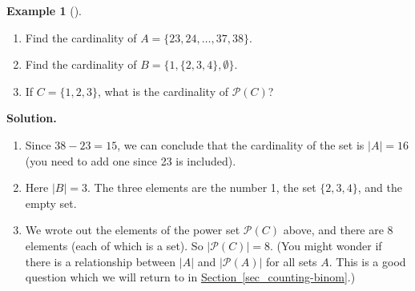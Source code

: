 \documentclass[12pt,]{book}
\theoremstyle{plain}
\theoremstyle{definition}
\theoremstyle{definition}
\newtheorem{example}[theorem]{Example}
\theoremstyle{definition}
\numberwithin{equation}{chapter}
\newcommand{\pow}{\mathcal P}
\newcommand{\card}[1]{\left| #1 \right|}
\begin{document}
\begin{example}[]\label{example-31}
\hypertarget{p-580}{}%
\leavevmode%
\begin{enumerate}
\item\hypertarget{li-253}{}\hypertarget{p-581}{}%
Find the cardinality of \(A = \{23, 24, \ldots, 37, 38\}\).%
\item\hypertarget{li-254}{}\hypertarget{p-582}{}%
Find the cardinality of \(B = \{1, \{2, 3, 4\}, \emptyset\}\).%
\item\hypertarget{li-255}{}\hypertarget{p-583}{}%
If \(C = \{1,2,3\}\), what is the cardinality of \(\pow(C)\)?%
\end{enumerate}
%
\par\smallskip%
\noindent\textbf{Solution.}\hypertarget{solution-66}{}\quad%
\hypertarget{p-584}{}%
\leavevmode%
\begin{enumerate}
\item\hypertarget{li-256}{}\hypertarget{p-585}{}%
Since \(38 - 23 = 15\), we can conclude that the cardinality of the set is \(|A| = 16\) (you need to add one since 23 is included).%
\item\hypertarget{li-257}{}\hypertarget{p-586}{}%
Here \(|B| = 3\). The three elements are the number 1, the set \(\{2,3,4\}\), and the empty set.%
\item\hypertarget{li-258}{}\hypertarget{p-587}{}%
We wrote out the elements of the power set \(\pow(C)\) above, and there are 8 elements (each of which is a set). So \(\card{\pow(C)} = 8\).  (You might wonder if there is a relationship between \(\card{A}\) and \(\card{\pow(A)}\) for all sets \(A\).  This is a good question which we will return to in \hyperref[sec_counting-binom]{Section~\ref{sec_counting-binom}}.)%
\end{enumerate}
%
\end{example}
\typeout{************************************************}
\typeout{************************************************}
\end{document}
